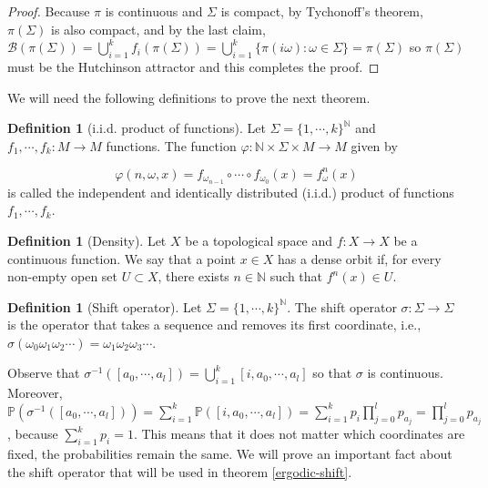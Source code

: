 \documentclass[a4paper]{article}
\theoremstyle{plain}
\theoremstyle{definition}
\newtheorem{defn}[theorem]{Definition}%
\newcommand{\PP}{\mathbb{P}}
\begin{document}
\begin{proof}
Because $\pi$ is continuous and $\Sigma$ is compact, by Tychonoff's theorem, $\pi(\Sigma)$ is also compact, and by the last claim, $\mathcal B(\pi(\Sigma)) = \bigcup_{i=1}^k f_i(\pi(\Sigma)) = \bigcup_{i=1}^k \{\pi(i\omega):\omega\in\Sigma\}=\pi(\Sigma)$ so $\pi(\Sigma) $ must be the Hutchinson attractor and this completes the proof.
\end{proof}

We will need the following definitions to prove the next theorem.

\begin{defn}[i.i.d. product of functions] Let $\Sigma = \{1, \cdots, k\}^\mathbb N$ and $f_1, \cdots, f_k:M\rightarrow M$ functions. The function $\varphi:\mathbb N\times\Sigma\times M\rightarrow M$ given by

$$\varphi(n, \omega, x)=f_{\omega_{n-1}}\circ\cdots\circ f_{\omega_0}(x)=f_\omega^n(x)$$
is called the independent and identically distributed (i.i.d.) product of functions $f_1, \cdots, f_k$.
\end{defn}

\begin{defn}[Density] Let $X$ be a topological space and $f:X\to X$ be a continuous function. We say that a point $x\in X$ has a dense orbit if, for every non-empty open set $U\subset X$, there exists $n\in\mathbb N$ such that $f^n(x)\in U$.
\end{defn}

\begin{defn}[Shift operator] Let $\Sigma = \{1, \cdots, k\}^\mathbb N$. The shift operator $\sigma:\Sigma\to\Sigma$ is the operator that takes a sequence and removes its first coordinate, i.e., $\sigma(\omega_0\omega_1\omega_2\cdots)=\omega_1\omega_2\omega_3\cdots$.
\end{defn}

Observe that $\sigma^{-1}([a_0, \cdots, a_l]) = \bigcup_{i=1}^k [i, a_0, \cdots, a_l]$ so that $\sigma$ is continuous. Moreover, $\PP(\sigma^{-1}([a_0, \cdots, a_l]))=\sum_{i=1}^k \PP([i, a_0, \cdots, a_l]) = \sum_{i=1}^k p_i\prod_{j=0}^l p_{a_j} = \prod_{j=0}^l p_{a_j}$, because $\sum_{i=1}^k p_i=1$. This means that it does not matter which coordinates are fixed, the probabilities remain the same. We will prove an important fact about the shift operator that will be used in theorem \ref{ergodic-shift}.
\end{document}
